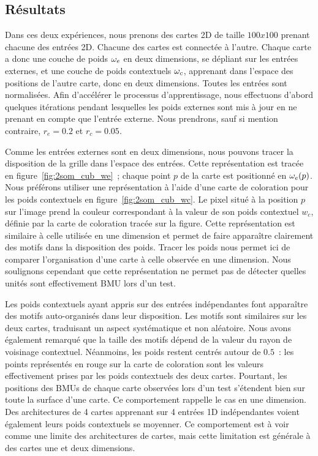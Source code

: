 \documentclass[../main]{subfiles}
\begin{document}
\subsection{Résultats}

Dans ces deux expériences, nous prenons des cartes 2D de taille $100x100$ prenant chacune des entrées 2D. Chacune des cartes est connectée à l'autre. Chaque carte a donc une couche de poids $\omega_{e}$ en deux dimensions, se dépliant sur les entrées externes, et une couche de poids contextuels $\omega_c$, apprenant dans l'espace des positions de l'autre carte, donc en deux dimensions. Toutes les entrées sont normalisées.
Afin d'accélérer le processus d'apprentissage, nous effectuons d'abord quelques itérations pendant lesquelles les poids externes sont mis à jour en ne prenant en compte que l'entrée externe. Nous prendrons, sauf si mention contraire, $r_e = 0.2$ et $r_c = 0.05$. 

Comme les entrées externes sont en deux dimensions, nous pouvons tracer la disposition de la grille dans l'espace des entrées.
Cette représentation est tracée en figure~\ref{fig:2som_cub_we}~; chaque point $p$ de la carte est positionné en $\omega_e(p)$. Nous préférons utiliser une représentation à l'aide d'une carte de coloration pour les poids contextuels en figure~\ref{fig:2som_cub_wc}. Le pixel situé à la position $p$ sur l'image prend la couleur correspondant à la valeur de son poids contextuel $w_c$, définie par la carte de coloration tracée sur la figure.
Cette représentation est similaire à celle utilisée en une dimension et permet de faire apparaître clairement des motifs dans la disposition des poids.
Tracer les poids nous permet ici de comparer l'organisation d'une carte à celle observée en une dimension. Nous soulignons cependant que cette représentation ne permet pas de détecter quelles unités sont effectivement BMU lors d'un test.

Les poids contextuels ayant appris sur des entrées indépendantes font apparaître des motifs auto-organisés dans leur disposition. Les motifs sont similaires sur les deux cartes, traduisant un aspect systématique et non aléatoire. Nous avons également remarqué que la taille des motifs dépend de la valeur du rayon de voisinage contextuel.
Néanmoins, les poids restent centrés autour de $0.5$~: les points représentés en rouge sur la carte de coloration sont les valeurs effectivement prises par les poids contextuels des deux cartes. Pourtant, les positions des BMUs de chaque carte observées lors d'un test s'étendent bien sur toute la surface d'une carte.
Ce comportement rappelle le cas en une dimension. Des architectures de 4 cartes apprenant sur 4 entrées 1D indépendantes voient également leurs poids contextuels se moyenner. Ce comportement est à voir comme une limite des architectures de cartes, mais cette limitation est générale à des cartes une et deux dimensions. 
\end{document}
